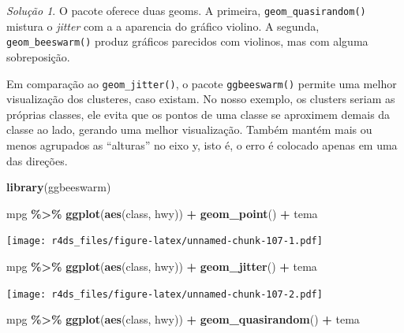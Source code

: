 \documentclass[
]{latex/krantz}
\newenvironment{Shaded}{\begin{snugshade}}{\end{snugshade}}
\newcommand{\FunctionTok}[1]{\textcolor[rgb]{0.13,0.29,0.53}{\textbf{#1}}}
\newcommand{\NormalTok}[1]{#1}
\newcommand{\SpecialCharTok}[1]{\textcolor[rgb]{0.81,0.36,0.00}{\textbf{#1}}}
\theoremstyle{definition}
\theoremstyle{definition}
\theoremstyle{definition}
\theoremstyle{definition}
\theoremstyle{remark}
\newtheorem*{solution}{Solução}
\begin{document}
\begin{solution}
O pacote oferece duas geoms. A primeira, \texttt{geom\_quasirandom()} mistura o \emph{jitter} com a a aparencia do gráfico violino. A segunda, \texttt{geom\_beeswarm()} produz gráficos parecidos com violinos, mas com alguma sobreposição.

Em comparação ao \texttt{geom\_jitter()}, o pacote \texttt{ggbeeswarm()} permite uma melhor visualização dos clusteres, caso existam. No nosso exemplo, os clusters seriam as próprias classes, ele evita que os pontos de uma classe se aproximem demais da classe ao lado, gerando uma melhor visualização. Também mantém mais ou menos agrupados as ``alturas'' no eixo y, isto é, o erro é colocado apenas em uma das direções.

\begin{Shaded}
\begin{Highlighting}[]
\FunctionTok{library}\NormalTok{(ggbeeswarm)}

\NormalTok{mpg }\SpecialCharTok{\%\textgreater{}\%}
    \FunctionTok{ggplot}\NormalTok{(}\FunctionTok{aes}\NormalTok{(class, hwy)) }\SpecialCharTok{+}
        \FunctionTok{geom\_point}\NormalTok{() }\SpecialCharTok{+}
\NormalTok{        tema}
\end{Highlighting}
\end{Shaded}

\texttt{[image: r4ds\_files/figure-latex/unnamed-chunk-107-1.pdf]}

\begin{Shaded}
\begin{Highlighting}[]
\NormalTok{mpg }\SpecialCharTok{\%\textgreater{}\%}
    \FunctionTok{ggplot}\NormalTok{(}\FunctionTok{aes}\NormalTok{(class, hwy)) }\SpecialCharTok{+}
        \FunctionTok{geom\_jitter}\NormalTok{() }\SpecialCharTok{+}
\NormalTok{        tema}
\end{Highlighting}
\end{Shaded}

\texttt{[image: r4ds\_files/figure-latex/unnamed-chunk-107-2.pdf]}

\begin{Shaded}
\begin{Highlighting}[]
\NormalTok{mpg }\SpecialCharTok{\%\textgreater{}\%}
    \FunctionTok{ggplot}\NormalTok{(}\FunctionTok{aes}\NormalTok{(class, hwy)) }\SpecialCharTok{+}
        \FunctionTok{geom\_quasirandom}\NormalTok{() }\SpecialCharTok{+}
\NormalTok{        tema}
\end{Highlighting}
\end{Shaded}


\end{solution}
\end{document}
